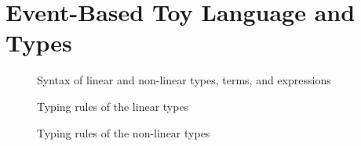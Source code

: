\section{Event-Based Toy Language and Types}

\begin{figure}
    \centering
    
    \caption{Syntax of linear and non-linear types, terms, and expressions}
    \label{fig:syntax-of-types-terms-expressions}
\end{figure}

\begin{figure}
    \centering
    
    \caption{Typing rules of the linear types}
    \label{fig:typing-rules-for-linear-types}
\end{figure}

\begin{figure}
    \centering
    
    \caption{Typing rules of the non-linear types}
    \label{fig:typing-rules-for-nonlinear-types}
\end{figure}